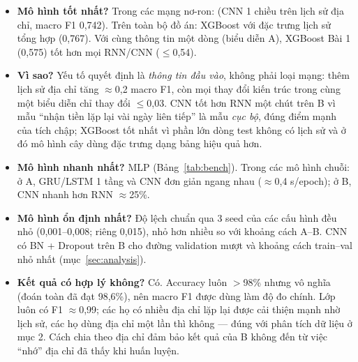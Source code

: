 \begin{itemize}
\item \textbf{Mô hình tốt nhất?} Trong các mạng nơ-ron:  (CNN 1 chiều trên lịch sử địa chỉ, macro F1 0,742).
  Trên toàn bộ đồ án: XGBoost với đặc trưng lịch sử tổng hợp (0,767). Với cùng thông tin một dòng (biểu diễn A), XGBoost Bài 1
  (0,575) tốt hơn mọi RNN/CNN ($\le$0,54).
\item \textbf{Vì sao?} Yếu tố quyết định là \emph{thông tin đầu vào}, không phải loại mạng: thêm lịch sử địa chỉ tăng
  $\approx$0,2 macro F1, còn mọi thay đổi kiến trúc trong cùng một biểu diễn chỉ thay đổi $\le$0,03. CNN tốt hơn RNN một chút trên B vì
  mẫu ``nhận tiền lặp lại vài ngày liên tiếp'' là mẫu \emph{cục bộ}, đúng điểm mạnh của tích chập; XGBoost tốt nhất vì phần lớn
  dòng test không có lịch sử và ở đó mô hình cây dùng đặc trưng dạng bảng hiệu quả hơn.
\item \textbf{Mô hình nhanh nhất?} MLP (Bảng~\ref{tab:bench}). Trong các mô hình chuỗi: ở A, GRU/LSTM 1 tầng và CNN đơn giản
  ngang nhau ($\approx$0,4 s/epoch); ở B, CNN nhanh hơn RNN $\approx$25\%.
\item \textbf{Mô hình ổn định nhất?} Độ lệch chuẩn qua 3 seed của các cấu hình đều nhỏ (0,001--0,008; riêng  0,015), nhỏ hơn nhiều so với
  khoảng cách A--B. CNN có BN + Dropout trên B cho đường validation mượt và khoảng cách train--val nhỏ nhất (mục~\ref{sec:analysis}).
\item \textbf{Kết quả có hợp lý không?} Có. Accuracy luôn $>$98\% nhưng vô nghĩa (đoán toàn  đã đạt 98,6\%), nên
  macro F1 được dùng làm độ đo chính. Lớp  luôn có F1 $\approx$0,99; các họ có nhiều địa chỉ lặp lại được cải thiện mạnh
  nhờ lịch sử, các họ dùng địa chỉ một lần thì không --- đúng với phân tích dữ liệu ở mục 2. Cách chia theo địa chỉ đảm bảo kết
  quả của B không đến từ việc ``nhớ'' địa chỉ đã thấy khi huấn luyện.
\end{itemize}
